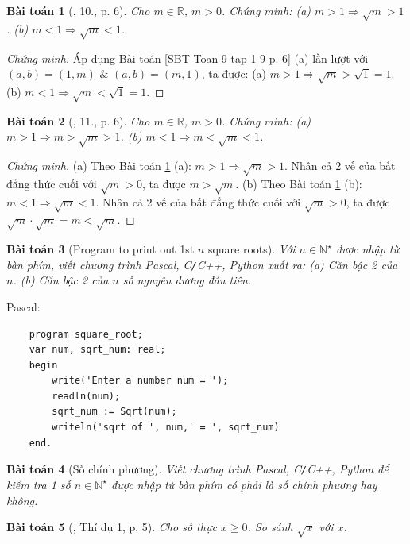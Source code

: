 \documentclass{article}
\newtheorem{baitoan}{Bài toán}
\begin{document}
\begin{baitoan}[\cite{SBT_Toan_9_tap_1}, 10., p. 6]
	\label{SBT Toan 9 tap 1 10 p. 6}
	Cho $m \in\mathbb{R}$, $m > 0$. Chứng minh: (a) $m > 1\Rightarrow\sqrt{m} > 1$. (b) $m < 1\Rightarrow\sqrt{m} < 1$.
\end{baitoan}

\begin{proof}[Chứng minh]
	Áp dụng Bài toán \ref{SBT Toan 9 tap 1 9 p. 6} (a) lần lượt với $(a,b) = (1,m)$ \& $(a,b) = (m,1)$, ta được: (a) $m > 1\Rightarrow\sqrt{m} > \sqrt{1} = 1$. (b) $m < 1\Rightarrow\sqrt{m} < \sqrt{1} = 1$.
\end{proof}

\begin{baitoan}[\cite{SBT_Toan_9_tap_1}, 11., p. 6]
	Cho $m \in\mathbb{R}$, $m > 0$. Chứng minh: (a) $m > 1\Rightarrow m > \sqrt{m} > 1$. (b) $m < 1\Rightarrow m < \sqrt{m} < 1$.
\end{baitoan}

\begin{proof}[Chứng minh]
	(a) Theo Bài toán \ref{SBT Toan 9 tap 1 10 p. 6} (a): $m > 1\Rightarrow\sqrt{m} > 1$. Nhân cả 2 vế của bất đẳng thức cuối với $\sqrt{m} > 0$, ta được $m > \sqrt{m}$. (b) Theo Bài toán \ref{SBT Toan 9 tap 1 10 p. 6} (b): $m < 1\Rightarrow\sqrt{m} < 1$. Nhân cả 2 vế của bất đẳng thức cuối với $\sqrt{m} > 0$, ta được $\sqrt{m}\cdot\sqrt{m} = m < \sqrt{m}$.
\end{proof}

\begin{baitoan}[Program to print out 1st $n$ square roots]
	Với $n\in\mathbb{N}^\star$ được nhập từ bàn phím, viết chương trình {\sf Pascal, C\texttt{/}C++, Python} xuất ra: (a) Căn bậc 2 của $n$. (b) Căn bậc 2 của $n$ số nguyên dương đầu tiên. 
\end{baitoan}
Pascal:
\begin{verbatim}
	program square_root;
	var num, sqrt_num: real;		
	begin
	    write('Enter a number num = ');
	    readln(num);
	    sqrt_num := Sqrt(num);
	    writeln('sqrt of ', num,' = ', sqrt_num)
	end.
\end{verbatim}

\begin{baitoan}[Số chính phương]
	Viết chương trình {\sf Pascal, C\texttt{/}C++, Python} để kiểm tra 1 số $n\in\mathbb{N}^\star$ được nhập từ bàn phím có phải là số chính phương hay không.
\end{baitoan}

\begin{baitoan}[\cite{Tuyen_Toan_9}, Thí dụ 1, p. 5]
	Cho số thực $x\ge0$. So sánh $\sqrt{x}$ với $x$.
\end{baitoan}
\end{document}
